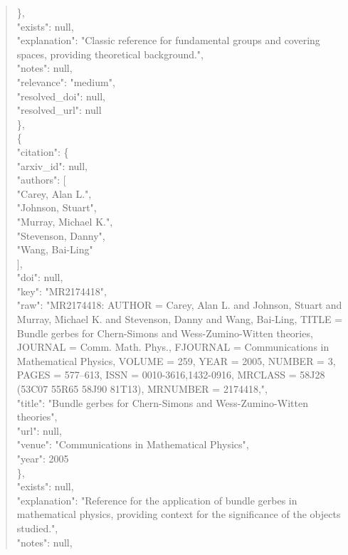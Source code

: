 \documentclass[11pt]{article}
\begin{document}
\begin{quote}
      \},\\
      "exists": null,\\
      "explanation": "Classic reference for fundamental groups and covering spaces, providing theoretical background.",\\
      "notes": null,\\
      "relevance": "medium",\\
      "resolved\_doi": null,\\
      "resolved\_url": null\\
    \},\\
    \{\\
      "citation": \{\\
        "arxiv\_id": null,\\
        "authors": [\\
          "Carey, Alan L.",\\
          "Johnson, Stuart",\\
          "Murray, Michael K.",\\
          "Stevenson, Danny",\\
          "Wang, Bai-Ling"\\
        ],\\
        "doi": null,\\
        "key": "MR2174418",\\
        "raw": "MR2174418: AUTHOR = Carey, Alan L. and Johnson, Stuart and Murray, Michael K. and Stevenson, Danny and Wang, Bai-Ling, TITLE = Bundle gerbes for Chern-Simons and Wess-Zumino-Witten theories, JOURNAL = Comm. Math. Phys., FJOURNAL = Communications in Mathematical Physics, VOLUME = 259, YEAR = 2005, NUMBER = 3, PAGES = 577--613, ISSN = 0010-3616,1432-0916, MRCLASS = 58J28 (53C07 55R65 58J90 81T13), MRNUMBER = 2174418,",\\
        "title": "Bundle gerbes for Chern-Simons and Wess-Zumino-Witten theories",\\
        "url": null,\\
        "venue": "Communications in Mathematical Physics",\\
        "year": 2005\\
      \},\\
      "exists": null,\\
      "explanation": "Reference for the application of bundle gerbes in mathematical physics, providing context for the significance of the objects studied.",\\
      "notes": null,\\

\end{quote}
\end{document}
